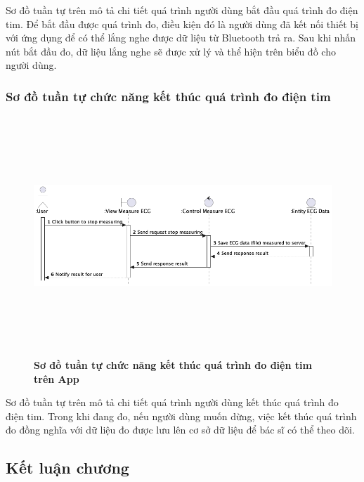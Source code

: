   Sơ đồ tuần tự trên mô tả chi tiết quá trình người dùng bắt đầu quá trình đo điện tim. Để bắt đầu được quá trình đo, điều
  kiện đó là người dùng đã kết nối thiết bị với ứng dụng để có thể lắng nghe được dữ liệu từ Bluetooth trả ra. Sau khi nhấn nút bắt đầu đo,
  dữ liệu lắng nghe sẽ được xử lý và thể hiện trên biểu đồ cho người dùng.

\subsubsection{Sơ đồ tuần tự chức năng kết thúc quá trình đo điện tim}
\mbox{}

  \begin{figure}[H]
        \centering
        \includegraphics[width=16cm,height=9cm]{Images/mobile_app/end_measuring_ecg.png}
        \caption[Sơ đồ tuần tự chức năng kết thúc quá trình đo điện tim trên App]{\bfseries \fontsize{12pt}{0pt}
        \selectfont Sơ đồ tuần tự chức năng kết thúc quá trình đo điện tim trên App}
        \label{end_measuring_ecg} %
  \end{figure}

  Sơ đồ tuần tự trên mô tả chi tiết quá trình người dùng kết thúc quá trình đo điện tim. Trong khi đang đo, nếu người dùng muốn dừng, 
  việc kết thúc quá trình đo đồng nghĩa với dữ liệu đo được lưu lên cơ sở dữ liệu để bác sĩ có thể theo dõi.

\subsection{Kết luận chương}
\newpage
